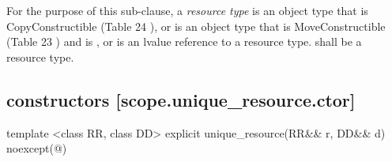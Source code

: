 \documentclass[ebook,11pt,article]{memoir}
\begin{document}
\pnum
For the purpose of this sub-clause, 
a \emph{resource type}  is an object type that is
CopyConstructible (Table 24
),  or 
is an object type that is MoveConstructible (Table 23
) and
 is ,
or is an lvalue reference to a resource type.
 shall be a resource type.
 

\newpage
\subsection { constructors [scope.unique_resource.ctor]}


\begin{itemdecl}
template <class RR, class DD>
explicit 
unique_resource(RR&& r, DD&& d) noexcept(@\seebelow@)
\end{itemdecl}
\end{document}
